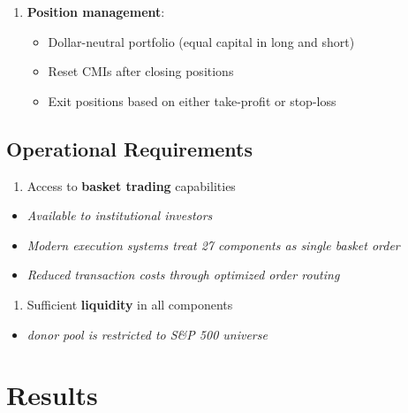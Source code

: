 \documentclass[
  letterpaper,
  DIV=11,
  numbers=noendperiod]{scrartcl}
\providecommand{\tightlist}{%
  \setlength{\itemsep}{0pt}\setlength{\parskip}{0pt}}\usepackage{longtable,booktabs,array}
\begin{document}
\begin{enumerate}
\def\labelenumi{\arabic{enumi}.}
\setcounter{enumi}{1}
\tightlist
\item
  \textbf{Position management}:

  \begin{itemize}
  \tightlist
  \item
    Dollar-neutral portfolio (equal capital in long and short)
  \item
    Reset CMIs after closing positions
  \item
    Exit positions based on either take-profit or stop-loss
  \end{itemize}
\end{enumerate}

\subsection{Operational Requirements}\label{operational-requirements}

\begin{enumerate}
\def\labelenumi{\arabic{enumi}.}
\tightlist
\item
  Access to \textbf{basket trading} capabilities
\end{enumerate}

\begin{itemize}
\tightlist
\item
  \emph{Available to institutional investors}
\item
  \emph{Modern execution systems treat 27 components as single basket
  order}
\item
  \emph{Reduced transaction costs through optimized order routing}
\end{itemize}

\begin{enumerate}
\def\labelenumi{\arabic{enumi}.}
\setcounter{enumi}{1}
\tightlist
\item
  Sufficient \textbf{liquidity} in all components
\end{enumerate}

\begin{itemize}
\tightlist
\item
  \emph{donor pool is restricted to S\&P 500 universe}
\end{itemize}

\section{Results}\label{results}
\end{document}
